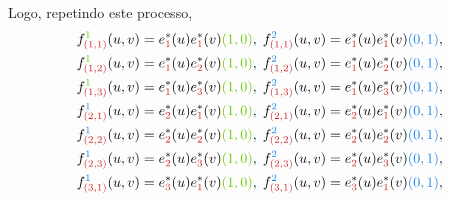 \documentclass[../differential_forms.tex]{subfiles}
\begin{document}
\begin{example}
	Logo, repetindo este processo,
	\begin{align*}
		 & f_{{\color{Firebrick3}(1, 1)}}^{{\color{Chartreuse3}1}}(u, v) = e_{{\color{Firebrick3}1}}^{*}(u)e_{{\color{Firebrick3}1}}^{*}(v){\color{Chartreuse3}(1, 0)},\; f_{{\color{Firebrick3}(1, 1)}}^{{\color{DodgerBlue2}2}}(u, v) = e_{{\color{Firebrick3}1}}^{*}(u)e_{{\color{Firebrick3}1}}^{*}(v){\color{DodgerBlue2}(0, 1)}, \\
		 & f_{{\color{Firebrick3}(1, 2)}}^{{\color{Chartreuse3}1}}(u, v) = e_{{\color{Firebrick3}1}}^{*}(u)e_{{\color{Firebrick3}2}}^{*}(v){\color{Chartreuse3}(1, 0)},\; f_{{\color{Firebrick3}(1, 2)}}^{{\color{DodgerBlue2}2}}(u, v) = e_{{\color{Firebrick3}1}}^{*}(u)e_{{\color{Firebrick3}2}}^{*}(v){\color{DodgerBlue2}(0, 1)}, \\
		 & f_{{\color{Firebrick3}(1, 3)}}^{{\color{Chartreuse3}1}}(u, v) = e_{{\color{Firebrick3}1}}^{*}(u)e_{{\color{Firebrick3}3}}^{*}(v){\color{Chartreuse3}(1, 0)},\; f_{{\color{Firebrick3}(1, 3)}}^{{\color{DodgerBlue2}2}}(u, v) = e_{{\color{Firebrick3}1}}^{*}(u)e_{{\color{Firebrick3}3}}^{*}(v){\color{DodgerBlue2}(0, 1)}, \\
		 & f_{{\color{Firebrick3}(2, 1)}}^{{\color{DodgerBlue2}1}}(u, v) = e_{{\color{Firebrick3}2}}^{*}(u)e_{{\color{Firebrick3}1}}^{*}(v){\color{Chartreuse3}(1, 0)},\; f_{{\color{Firebrick3}(2, 1)}}^{{\color{DodgerBlue2}2}}(u, v) = e_{{\color{Firebrick3}2}}^{*}(u)e_{{\color{Firebrick3}1}}^{*}(v){\color{DodgerBlue2}(0, 1)}, \\
		 & f_{{\color{Firebrick3}(2, 2)}}^{{\color{DodgerBlue2}1}}(u, v) = e_{{\color{Firebrick3}2}}^{*}(u)e_{{\color{Firebrick3}2}}^{*}(v){\color{Chartreuse3}(1, 0)},\; f_{{\color{Firebrick3}(2, 2)}}^{{\color{DodgerBlue2}2}}(u, v) = e_{{\color{Firebrick3}2}}^{*}(u)e_{{\color{Firebrick3}2}}^{*}(v){\color{DodgerBlue2}(0, 1)}, \\
		 & f_{{\color{Firebrick3}(2, 3)}}^{{\color{DodgerBlue2}1}}(u, v) = e_{{\color{Firebrick3}2}}^{*}(u)e_{{\color{Firebrick3}3}}^{*}(v){\color{Chartreuse3}(1, 0)},\; f_{{\color{Firebrick3}(2, 3)}}^{{\color{DodgerBlue2}2}}(u, v) = e_{{\color{Firebrick3}2}}^{*}(u)e_{{\color{Firebrick3}3}}^{*}(v){\color{DodgerBlue2}(0, 1)}, \\
		 & f_{{\color{Firebrick3}(3, 1)}}^{{\color{DodgerBlue2}1}}(u, v) = e_{{\color{Firebrick3}3}}^{*}(u)e_{{\color{Firebrick3}1}}^{*}(v){\color{Chartreuse3}(1, 0)},\; f_{{\color{Firebrick3}(3, 1)}}^{{\color{DodgerBlue2}2}}(u, v) = e_{{\color{Firebrick3}3}}^{*}(u)e_{{\color{Firebrick3}1}}^{*}(v){\color{DodgerBlue2}(0, 1)}, \\

\end{align*}
\end{example}
\end{document}
